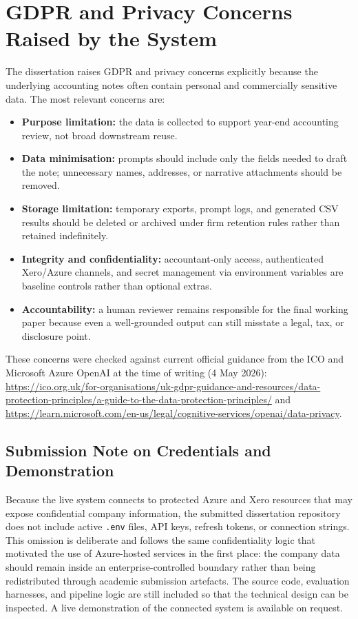 \section{GDPR and Privacy Concerns Raised by the System}
\label{app:sec:gdpr_concerns}

The dissertation raises GDPR and privacy concerns explicitly because the underlying accounting notes often contain personal and commercially sensitive data. The most relevant concerns are:
\begin{itemize}
    \item \textbf{Purpose limitation:} the data is collected to support year-end accounting review, not broad downstream reuse.
    \item \textbf{Data minimisation:} prompts should include only the fields needed to draft the note; unnecessary names, addresses, or narrative attachments should be removed.
    \item \textbf{Storage limitation:} temporary exports, prompt logs, and generated CSV results should be deleted or archived under firm retention rules rather than retained indefinitely.
    \item \textbf{Integrity and confidentiality:} accountant-only access, authenticated Xero/Azure channels, and secret management via environment variables are baseline controls rather than optional extras.
    \item \textbf{Accountability:} a human reviewer remains responsible for the final working paper because even a well-grounded output can still misstate a legal, tax, or disclosure point.
\end{itemize}

These concerns were checked against current official guidance from the ICO and Microsoft Azure OpenAI at the time of writing (4 May 2026): \url{https://ico.org.uk/for-organisations/uk-gdpr-guidance-and-resources/data-protection-principles/a-guide-to-the-data-protection-principles/} and \url{https://learn.microsoft.com/en-us/legal/cognitive-services/openai/data-privacy}.

\subsection{Submission Note on Credentials and Demonstration}

Because the live system connects to protected Azure and Xero resources that may expose confidential company information, the submitted dissertation repository does not include active \texttt{.env} files, API keys, refresh tokens, or connection strings. This omission is deliberate and follows the same confidentiality logic that motivated the use of Azure-hosted services in the first place: the company data should remain inside an enterprise-controlled boundary rather than being redistributed through academic submission artefacts. The source code, evaluation harnesses, and pipeline logic are still included so that the technical design can be inspected. A live demonstration of the connected system is available on request.

